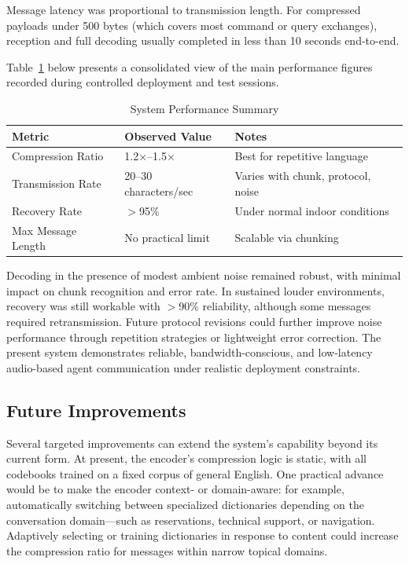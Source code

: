 \documentclass[12pt,openany]{article}
\theoremstyle{definition}
\theoremstyle{definition}
\theoremstyle{definition}
\begin{document}
Message latency was proportional to transmission length. For compressed payloads under 500 bytes (which covers most command or query exchanges), reception and full decoding usually completed in less than 10 seconds end-to-end.

Table~\ref{tab:system-metrics} below presents a consolidated view of the main performance figures recorded during controlled deployment and test sessions.

\begin{table}[h]
    \centering
    \begin{tabular}{|l|l|l|}
        \hline
        \textbf{Metric} & \textbf{Observed Value} & \textbf{Notes} \\
        \hline
        Compression Ratio & 1.2×–1.5× & Best for repetitive language \\
        Transmission Rate & 20–30 characters/sec & Varies with chunk, protocol, noise \\
        Recovery Rate & $>$95\% & Under normal indoor conditions \\
        Max Message Length & No practical limit & Scalable via chunking \\
        \hline
    \end{tabular}
    \caption{System Performance Summary}
    \label{tab:system-metrics}
\end{table}

Decoding in the presence of modest ambient noise remained robust, with minimal impact on chunk recognition and error rate. In sustained louder environments, recovery was still workable with $>$90\% reliability, although some messages required retransmission. Future protocol revisions could further improve noise performance through repetition strategies or lightweight error correction. The present system demonstrates reliable, bandwidth-conscious, and low-latency audio-based agent communication under realistic deployment constraints.

\subsection*{Future Improvements}
Several targeted improvements can extend the system’s capability beyond its current form. At present, the encoder’s compression logic is static, with all codebooks trained on a fixed corpus of general English. One practical advance would be to make the encoder context- or domain-aware: for example, automatically switching between specialized dictionaries depending on the conversation domain—such as reservations, technical support, or navigation. Adaptively selecting or training dictionaries in response to content could increase the compression ratio for messages within narrow topical domains.
\end{document}
